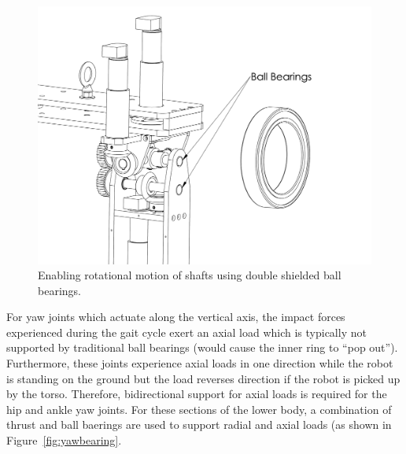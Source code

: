 \begin{figure}[!h]
	\begin{center}
    \includegraphics[scale=0.5]{fig/design/ballbearings.pdf}
	\end{center}
  \caption{Enabling rotational motion of shafts using double shielded ball bearings.}
\label{fig:ballb}
\end{figure}

For yaw joints which actuate along the vertical axis, the impact forces experienced during the gait cycle exert an axial load which is typically not supported by traditional ball bearings (would cause the inner ring to ``pop out''). Furthermore, these joints experience axial loads in one direction while the robot is standing on the ground but the load reverses direction if the robot is picked up by the torso. Therefore, bidirectional support for axial loads is required for the hip and ankle yaw joints. For these sections of the lower body, a combination of thrust and ball baerings are used to support radial and axial loads (as shown in Figure~\ref{fig:yawbearing}. 

